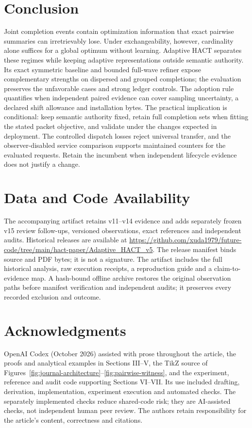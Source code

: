 \documentclass[10pt,journal,compsoc]{IEEEtran}
\theoremstyle{definition}\newtheorem{definition}[theorem]{Definition}
\begin{document}
\section{Conclusion}
Joint completion events contain optimization information that exact pairwise
summaries can irretrievably lose. Under exchangeability, however, cardinality
alone suffices for a global optimum without learning. Adaptive HACT separates
these regimes while keeping adaptive representations outside semantic
authority. Its exact symmetric baseline and bounded full-wave refiner expose
complementary strengths on dispersed and grouped completions; the evaluation
preserves the unfavorable cases and strong ledger controls.
The adoption rule quantifies when independent paired evidence can cover
sampling uncertainty, a declared shift allowance and installation bytes.
The practical implication is conditional: keep semantic authority fixed,
retain full completion sets when fitting the stated packet objective, and
validate under the changes expected in deployment. The controlled dispatch
losses reject universal transfer, and the observer-disabled service comparison
supports maintained counters for the evaluated requests. Retain the incumbent
when independent lifecycle evidence does not justify a change.

\section*{Data and Code Availability}
The accompanying artifact retains v11--v14 evidence and adds separately
frozen v15 review follow-ups, versioned observations,
exact references and independent audits. Historical releases are available at
\url{https://github.com/xuda1979/future-code/tree/main/hact-paper/Adaptive_HACT_v5}.
The release manifest binds source and PDF bytes; it is not a signature.
The artifact includes the full historical analysis, raw execution receipts,
a reproduction guide and a claim-to-evidence map. A hash-bound offline
archive restores the original observation paths before manifest verification
and independent audits; it preserves every recorded exclusion and outcome.
\section*{Acknowledgments}
OpenAI Codex (October 2026) assisted with prose throughout the article,
the proofs and analytical examples in Sections III--V, the TikZ source
of Figures~\ref{fig:journal-architecture}--\ref{fig:pairwise-witness}, and the experiment, reference and
audit code supporting Sections VI--VII. Its use included drafting,
derivation, implementation, experiment execution and automated checks.
The separately implemented checks reduce shared-code risk; they are
AI-assisted checks, not independent human peer review. The authors retain
responsibility for the article's content, correctness and citations.


\end{document}
